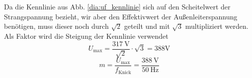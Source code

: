 \chapter{}\label{ex:aufg6}
%
\section{}\label{sec:aufg6a}
%
Da die Kennlinie aus Abb. \ref{dia:uf_kennlinie} sich auf den Scheitelwert der Strangspannung bezieht, wir aber den Effektivwert der Außenleiterspannung benötigen, muss dieser noch durch $\sqrt 2$ geteilt und mit $\sqrt 3$ multipliziert werden.
Als Faktor wird die Steigung der Kennlinie verwendet
\begin{equation}
	U_{\text{max}} = \frac{317~\text{V}}{\sqrt{2}} \cdot \sqrt{3} = 388 \text{V}
\end{equation}
\begin{equation}
	m = \frac{U_{\text{max}}}{f_{\text{Knick}}} = \frac{388~\text{V}}{50~\text{Hz}}
\end{equation}
%
